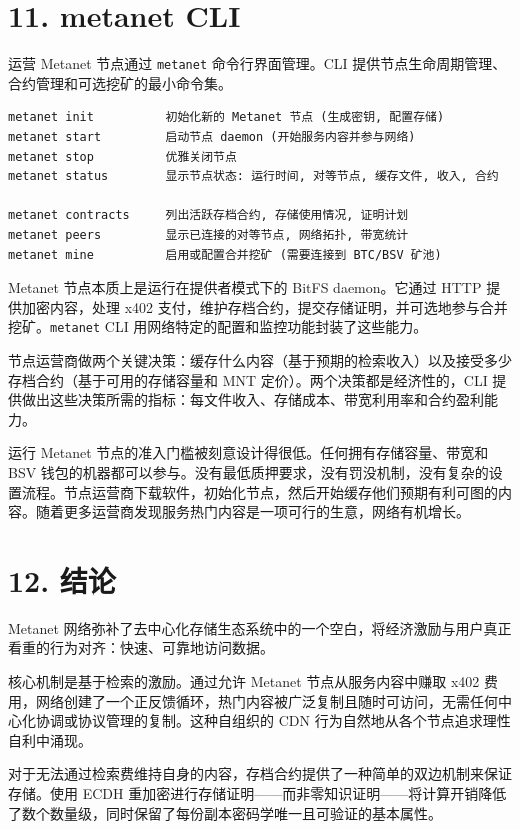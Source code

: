 \documentclass[11pt,a4paper]{article}
\begin{document}
\section{11. metanet CLI}

运营 Metanet 节点通过 \texttt{metanet} 命令行界面管理。CLI 提供节点生命周期管理、合约管理和可选挖矿的最小命令集。

\begin{lstlisting}
metanet init          初始化新的 Metanet 节点 (生成密钥, 配置存储)
metanet start         启动节点 daemon (开始服务内容并参与网络)
metanet stop          优雅关闭节点
metanet status        显示节点状态: 运行时间, 对等节点, 缓存文件, 收入, 合约

metanet contracts     列出活跃存档合约, 存储使用情况, 证明计划
metanet peers         显示已连接的对等节点, 网络拓扑, 带宽统计
metanet mine          启用或配置合并挖矿 (需要连接到 BTC/BSV 矿池)
\end{lstlisting}

Metanet 节点本质上是运行在提供者模式下的 BitFS daemon。它通过 HTTP 提供加密内容，处理 x402 支付，维护存档合约，提交存储证明，并可选地参与合并挖矿。\texttt{metanet} CLI 用网络特定的配置和监控功能封装了这些能力。

节点运营商做两个关键决策：缓存什么内容（基于预期的检索收入）以及接受多少存档合约（基于可用的存储容量和 MNT 定价）。两个决策都是经济性的，CLI 提供做出这些决策所需的指标：每文件收入、存储成本、带宽利用率和合约盈利能力。

运行 Metanet 节点的准入门槛被刻意设计得很低。任何拥有存储容量、带宽和 BSV 钱包的机器都可以参与。没有最低质押要求，没有罚没机制，没有复杂的设置流程。节点运营商下载软件，初始化节点，然后开始缓存他们预期有利可图的内容。随着更多运营商发现服务热门内容是一项可行的生意，网络有机增长。

\section{12. 结论}

Metanet 网络弥补了去中心化存储生态系统中的一个空白，将经济激励与用户真正看重的行为对齐：快速、可靠地访问数据。

核心机制是基于检索的激励。通过允许 Metanet 节点从服务内容中赚取 x402 费用，网络创建了一个正反馈循环，热门内容被广泛复制且随时可访问，无需任何中心化协调或协议管理的复制。这种自组织的 CDN 行为自然地从各个节点追求理性自利中涌现。

对于无法通过检索费维持自身的内容，存档合约提供了一种简单的双边机制来保证存储。使用 ECDH 重加密进行存储证明——而非零知识证明——将计算开销降低了数个数量级，同时保留了每份副本密码学唯一且可验证的基本属性。
\end{document}
